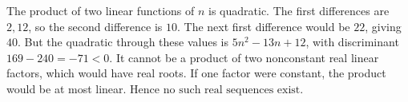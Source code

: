 The product of two linear functions of $n$ is quadratic. The first differences are $2,12$, so the second difference is $10$. The next first difference would be $22$, giving $\boxed{40}$.
But the quadratic through these values is $5n^2-13n+12$, with discriminant $169-240=-71<0$. It cannot be a product of two nonconstant real linear factors, which would have real roots. If one factor were constant, the product would be at most linear. Hence $\boxed{\text{no such real sequences exist}}$.
